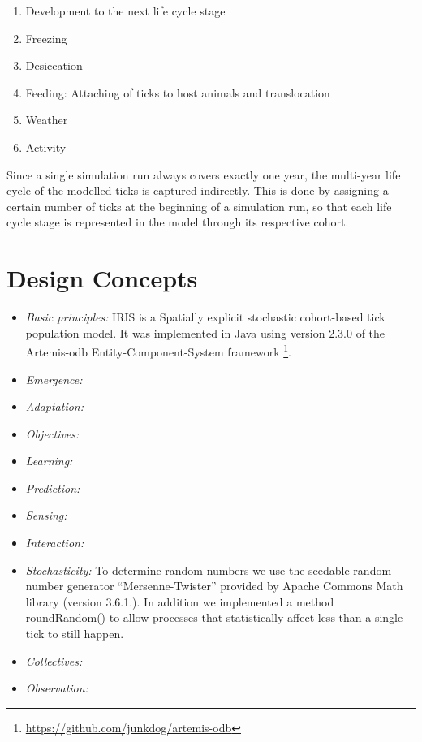 \documentclass[a4paper, 11pt]{scrartcl}
\begin{document}
\begin{enumerate}
	\item Development to the next life cycle stage
	\item Freezing
	\item Desiccation
	\item Feeding: Attaching of ticks to host animals and translocation
	\item Weather
	\item Activity
\end{enumerate}

Since a single simulation run always covers exactly one year, the multi-year life cycle of the modelled ticks is captured indirectly.
This is done by assigning a certain number of ticks at the beginning of a simulation run, so that each life cycle stage is represented in
the model through its respective cohort.


\newpage
\section{Design Concepts}

\begin{itemize}

\item \emph{Basic principles:}
IRIS is a Spatially explicit stochastic cohort-based tick population model. It was implemented in Java using version 2.3.0 of the Artemis-odb Entity-Component-System framework
\footnote{\url{https://github.com/junkdog/artemis-odb}}.

\item \emph{Emergence:}

\item \emph{Adaptation:}

\item \emph{Objectives:}

\item \emph{Learning:}

\item \emph{Prediction:}

\item \emph{Sensing:}

\item \emph{Interaction:}

\item \emph{Stochasticity:}
To determine random numbers we use the seedable random number generator ``Mersenne-Twister'' provided by Apache Commons Math library
(version 3.6.1.). In addition we implemented a method roundRandom() to allow processes that statistically affect less than
a single tick to still happen.

\item \emph{Collectives:}

\item \emph{Observation:}

\end{itemize}
\end{document}
